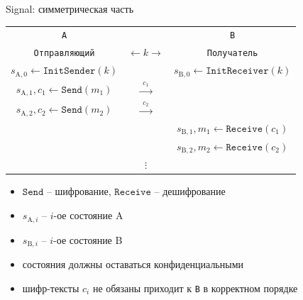 \documentclass[usenames,dvipsnames,8pt,aspectratio=169]{beamer}
\begin{document}
\begin{frame}{Signal: симметрическая часть}
\LARGE
	\begin{center}
		\begin{tabular}{c c c }
			{\LARGE \color{Orange}\texttt{A}}&    & {\LARGE \color{Orange}\texttt{B}}  \\
			{\color{Orange}\texttt{Отправляющий}}&  {\LARGE $\leftarrow k \rightarrow $ }  & {\color{Orange}\texttt{Получатель}}   \\[10pt]
			$s_{\text{A},0} \leftarrow \mathtt{InitSender}(k)$& & $s_{\text{B},0} \leftarrow \mathtt{InitReceiver}(k)$ \\[10pt]
			$s_{\text{A},1}, c_1 \leftarrow \mathtt{Send}(m_1)$& $\xrightarrow{\hspace{5pt}c_1\hspace{5pt}}$ & \\
			$s_{\text{A},2}, c_2 \leftarrow \mathtt{Send}(m_2)$& $\xrightarrow{\hspace{5pt}c_2\hspace{5pt}}$ & \\
			& & $s_{\text{B},1}, m_1 \leftarrow \mathtt{Receive}(c_1)$ \\
			& & $s_{\text{B},2}, m_2 \leftarrow \mathtt{Receive}(c_2)$ \\
			& $\vdots $& \\
		\end{tabular}
	\end{center} 
\begin{itemize}
	\item $\mathtt{Send}$ -- шифрование, $\mathtt{Receive}$ -- дешифрование
	\item $s_{\text{A},i}$ -- $i$-ое состояние A
	\item $s_{\text{B},i}$ -- $i$-ое состояние B
	\item состояния должны оставаться конфиденциальными
	\item шифр-тексты $c_i$ не обязаны приходит к \texttt{B} в корректном порядке
\end{itemize}

\end{frame}
\end{document}
